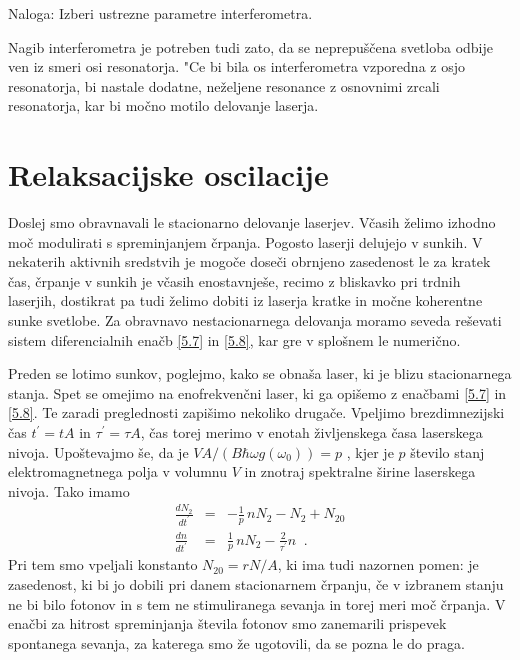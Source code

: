 Naloga: Izberi ustrezne parametre interferometra.

Nagib interferometra je potreben tudi zato, da se neprepuščena svetloba
odbije ven iz smeri osi resonatorja. "Ce bi bila os interferometra vzporedna
z osjo resonatorja, bi nastale dodatne, neželjene resonance z osnovnimi
zrcali resonatorja, kar bi močno motilo delovanje laserja.

\section{Relaksacijske oscilacije}

Doslej smo obravnavali le stacionarno delovanje laserjev. Včasih želimo
izhodno moč modulirati s spreminjanjem črpanja. Pogosto laserji delujejo v
sunkih. V nekaterih aktivnih sredstvih je mogoče doseči obrnjeno
zasedenost le za kratek čas, črpanje v sunkih je včasih enostavnješe,
recimo z bliskavko pri trdnih laserjih, dostikrat pa tudi želimo dobiti iz
laserja kratke in močne koherentne sunke svetlobe. Za obravnavo
nestacionarnega delovanja moramo seveda reševati sistem diferencialnih
enačb \ref{5.7} in \ref{5.8}, kar gre v splošnem le numerično.

Preden se lotimo sunkov, poglejmo, kako se obnaša laser, ki je blizu
stacionarnega stanja. Spet se omejimo na enofrekvenčni laser, ki ga
opišemo z enačbami \ref{5.7} in \ref{5.8}. Te zaradi preglednosti
zapišimo nekoliko drugače. Vpeljimo brezdimnezijski čas $t^{\prime}=t A$
in $\tau^{\prime}=\tau A$, čas torej merimo v enotah življenskega časa
laserskega nivoja. Upoštevajmo še, da je $VA/(B\hbar\omega g(\omega_0))=p$%
, kjer je $p$ število stanj elektromagnetnega polja v volumnu $V$ in
znotraj spektralne širine laserskega nivoja. Tako imamo 
\begin{eqnarray}  \label{5.23}
\frac{d N_2}{d t^{\prime}}&=&-\frac{1}{p}\,nN_2-N_2+N_{20} \\
\frac{d n}{d t^{\prime}}& = & \frac{1}{p}\,nN_2-\frac{2}{\tau^{\prime}}n
\;\;.
\end{eqnarray}
Pri tem smo vpeljali konstanto $N_{20}= rN/A$, ki ima tudi nazornen pomen:
je zasedenost, ki bi jo dobili pri danem stacionarnem črpanju, če v
izbranem stanju ne bi bilo fotonov in s tem ne stimuliranega sevanja in
torej meri moč črpanja. V enačbi za hitrost spreminjanja števila fotonov
smo zanemarili prispevek spontanega sevanja, za katerega smo že ugotovili,
da se pozna le do praga.

